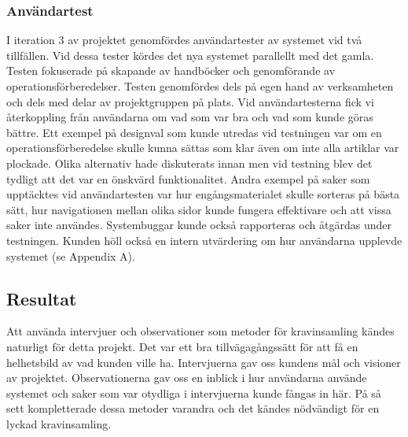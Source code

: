 
\subsubsection{Användartest}
I iteration 3 av projektet genomfördes användartester av systemet vid två tillfällen. Vid dessa tester kördes det nya systemet parallellt med det gamla. Testen fokuserade på skapande av handböcker och genomförande av operationsförberedelser. Testen genomfördes dels på egen hand av verksamheten och dels med delar av projektgruppen på plats. Vid användartesterna fick vi återkoppling från användarna om vad som var bra och vad som kunde göras bättre. Ett exempel på designval som kunde utredas vid testningen var om en operationsförberedelse skulle kunna sättas som klar även om inte alla artiklar var plockade. Olika alternativ hade diskuterats innan men vid testning blev det tydligt att det var en önskvärd funktionalitet. Andra exempel på saker som upptäcktes vid användartesten var hur engångsmaterialet skulle sorteras på bästa sätt, hur navigationen mellan olika sidor kunde fungera effektivare och att vissa saker inte användes.
Systembuggar kunde också rapporteras och åtgärdas under testningen.
Kunden höll också en intern utvärdering om hur användarna upplevde systemet (se Appendix A).


\subsection{Resultat}
Att använda intervjuer och observationer som metoder för kravinsamling kändes naturligt för detta projekt. Det var ett bra tillvägagångssätt för att få en helhetsbild av vad kunden ville ha. Intervjuerna gav oss kundens mål och visioner av projektet. Observationerna gav oss en inblick i hur användarna använde systemet och saker som var otydliga i intervjuerna kunde fångas in här. På så sett kompletterade dessa metoder varandra och det kändes nödvändigt för en lyckad kravinsamling.

